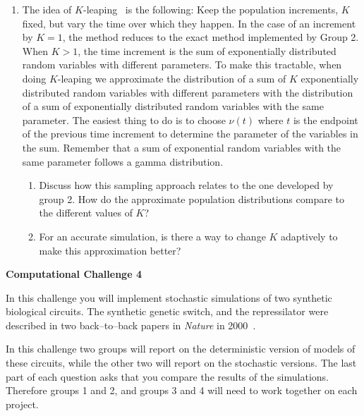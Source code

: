 \documentclass[12pt]{article}
\begin{document}
\begin{enumerate}
\item[\bf Group 4] 	
	The idea of $K$-leaping~\cite{cai07} is the following: Keep the population increments, $K$ fixed, but vary the time over which they happen. In the case of an increment by $K = 1$, the method reduces to the exact method implemented by Group 2. When $K > 1$, the time increment is the sum of exponentially distributed random variables with different parameters. To make this tractable, when doing $K$-leaping we approximate the distribution of a sum of $K$ exponentially distributed random variables with different parameters with the distribution of a sum of exponentially distributed random variables with the same parameter. The easiest thing to do is to choose $\nu(t)$ where $t$ is the endpoint of the previous time increment to determine the parameter of the variables in the sum. Remember that a sum of exponential random variables with the same parameter follows a gamma distribution.
	
\begin{enumerate}
	\item Discuss how this sampling approach relates to the one developed by group 2. How do the approximate population distributions compare to the different values of $K$?
	\item For an accurate simulation, is there a way to change $K$ adaptively to make this approximation better?	
\end{enumerate}
	
	
\end{enumerate}



\begin{center}
{\Large \bf Computational Challenge 4
\\ \vskip5mm }
\end{center}

In this challenge you will implement stochastic simulations of two synthetic biological circuits.
The synthetic genetic switch, and the repressilator were described in two back--to--back papers
in \emph{Nature} in 2000~\cite{elowitz00,gardner00}.  

In this challenge two groups will report on the deterministic version of models of these circuits, while the other two
will report on the stochastic versions. The last part of each question asks that you 
compare the results of the simulations. Therefore groups 1 and 2, and groups 3 and 4 will
need to work together on each project.
\end{document}
